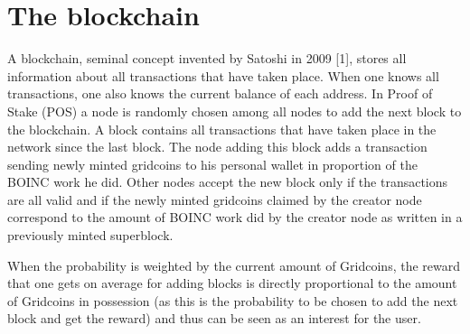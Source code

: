 \section{The blockchain}

A blockchain, seminal concept invented by Satoshi in 2009 [1], stores all information about all transactions that have taken place. When one knows all transactions, one also knows the current balance of each address. In Proof of Stake (POS) a node is randomly chosen among all nodes to add the next block to the blockchain. A block contains all transactions that have taken place in the network since the last block. The node adding this block adds a transaction sending newly minted gridcoins to his personal wallet in proportion of the BOINC work he did. Other nodes accept the new block only if the transactions are all valid and if the newly minted gridcoins claimed by the creator node correspond to the amount of BOINC work did by the creator node as written in a previously minted superblock. 
 
When the probability is weighted by the current amount of Gridcoins, the reward that one gets on average for adding blocks is directly proportional to the amount of Gridcoins in possession (as this is the probability to be chosen to add the next block and get the reward) and thus can be seen as an interest for the user.
